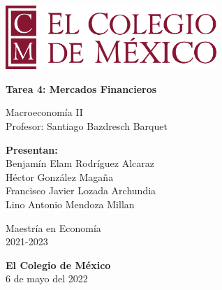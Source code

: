 \begin{titlepage}
   \begin{center}
       \vspace*{1cm}
      
        \includegraphics[width=0.6\textwidth]{COLMEX.png}
        
        \vspace*{1cm}

       \textbf{Tarea 4: Mercados Financieros}

       \vspace{0.5cm}
        Macroeconomía II \\
        \vspace{0.5cm}
        Profesor: Santiago Bazdresch Barquet
            
       \vspace{1.5cm}

       \textbf{Presentan:} \\
       \vspace{0.5cm}
       Benjamín Elam Rodríguez Alcaraz\\ 
       Héctor González Magaña\\ 
       Francisco Javier Lozada Archundia\\
       Lino Antonio Mendoza Millan 
       
       

       \vspace{3cm}
            
       Maestría en Economía\\
       2021-2023
            
       \vspace{0.8cm}
     
            
       \textbf{El Colegio de México}\\
       6 de mayo del 2022
            
   \end{center}
\end{titlepage}